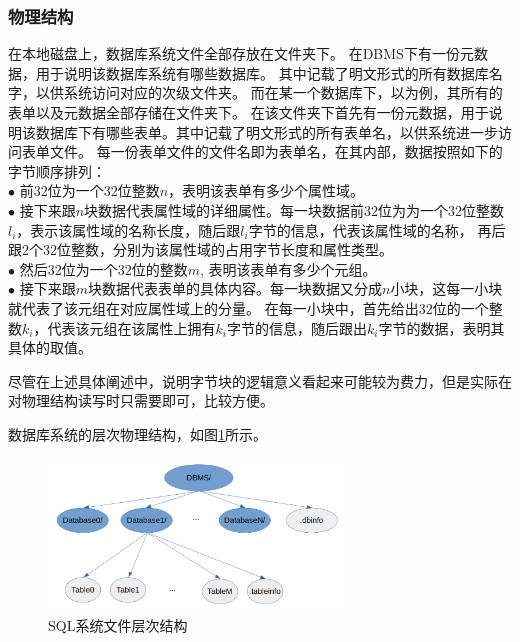 \documentclass{article}
\begin{document}
\begin{spacing}{2}
        \subsubsection{物理结构 \label{SecPhy}} 
            在本地磁盘上，数据库系统文件全部存放在文件夹下。
            在DBMS下有一份元数据，用于说明该数据库系统有哪些数据库。
            其中记载了明文形式的所有数据库名字，以供系统访问对应的次级文件夹。
            而在某一个数据库下，以为例，其所有的表单以及元数据全部存储在文件夹下。
            在该文件夹下首先有一份元数据，用于说明该数据库下有哪些表单。其中记载了明文形式的所有表单名，以供系统进一步访问表单文件。
            每一份表单文件的文件名即为表单名，在其内部，数据按照如下的字节顺序排列：\\
                \indent \space \space $\bullet$ 前32位为一个$32$位整数$n$，表明该表单有多少个属性域。 \\
                \indent \space \space $\bullet$ 接下来跟$n$块数据代表属性域的详细属性。每一块数据前$32$位为为一个$32$位整数$l_i$，表示该属性域的名称长度，随后跟$l_i$字节的信息，代表该属性域的名称，
                再后跟2个32位整数，分别为该属性域的占用字节长度和属性类型。\\
                \indent \space \space $\bullet$ 然后32位为一个$32$位的整数$m$, 表明该表单有多少个元组。 \\
                \indent \space \space $\bullet$ 接下来跟$m$块数据代表表单的具体内容。每一块数据又分成$n$小块，这每一小块就代表了该元组在对应属性域上的分量。
                在每一小块中，首先给出$32$位的一个整数$k_i$，代表该元组在该属性上拥有$k_i$字节的信息，随后跟出$k_i$字节的数据，表明其具体的取值。
            

            尽管在上述具体阐述中，说明字节块的逻辑意义看起来可能较为费力，但是实际在对物理结构读写时只需要即可，比较方便。

            数据库系统的层次物理结构，如图\ref{FigStru}所示。
            
            \begin{figure}[h]
                \centering
                \includegraphics[width=0.7\textwidth]{structure.png}
                \caption{SQL系统文件层次结构} 
                \label{FigStru}                
            \end{figure}


\end{spacing}
\end{document}
